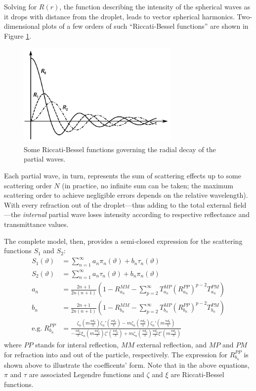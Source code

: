 \documentclass[11.5pt,oneside]{book}
\begin{document}
Solving for $R(r)$, the function describing the intensity of the spherical waves
as it drops with distance from the droplet, leads to vector spherical harmonics.
Two-dimensional plots of a few orders of such ``Riccati-Bessel functions'' are
shown in Figure \ref{fig:besselfuncs}.

\begin{figure}
    \centering
    \includegraphics[width=0.7\textwidth]{img/scattering/bessel.pdf}
    \caption{Some Riccati-Bessel functions governing the radial decay of the partial
    waves.}
    \label{fig:besselfuncs}
\end{figure}

Each partial wave, in turn, represents the sum of scattering effects up to some
scattering order $N$ (in practice, no infinite sum can be taken; the maximum
scattering order to achieve negligible errors depends on the relative
wavelength). With every refraction out of the droplet---thus adding to the
total external field---the \emph{internal} partial wave loses intensity
according to respective reflectance and transmittance values.


The complete model, then, provides a semi-closed expression for the scattering
functions $S_1$ and $S_2$:
   \begin{align}
      S_1(\vartheta) &= \sum_{n=1}^{\infty} a_n\pi_n(\vartheta) +
      b_n\tau_n(\vartheta) \\
      S_2(\vartheta) &= \sum_{n=1}^{\infty} a_n\tau_n(\vartheta) +
      b_n\pi_n(\vartheta) \\
      a_n &= \frac{2n+1}{2n(n+1)} (1-R^{MM}_{a_n} - \sum_{p=2}^{\infty}
      T_{a_n}^{MP} (R_{a_n}^{PP})^{p-2} T_{a_n}^{PM}) \\
      b_n &= \frac{2n+1}{2n(n+1)} (1-R^{MM}_{b_n} - \sum_{p=2}^{\infty}
      T_{b_n}^{MP} (R_{b_n}^{PP})^{p-2} T_{b_n}^{PM}) \\
      \mathrm{e.g.\;} R_{b_n}^{PP} &= \frac{\zeta_n(m \frac{\pi
      d_p}{\lambda})\zeta_n'(\frac{\pi d_p}{\lambda}) -
      m\zeta_n(\frac{\pi d_p}{\lambda})\zeta_n'(m \frac{\pi
      d_p}{\lambda})}{-\frac{\pi d_p}{\lambda}\xi_n(m \frac{\pi
      d_p}{\lambda})\zeta'(\frac{\pi d_p}{\lambda}) + m\zeta_n(\frac{\pi
      d_p}{\lambda})\frac{\pi d_p}{\lambda}\xi'(m \frac{\pi
      d_p}{\lambda})}
    \end{align}
where $PP$ stands for interal reflection, $MM$ external reflection, and $MP$
and $PM$ for refraction into and out of the particle, respectively. The
expression for $R_{b_n}^{PP}$ is shown above to illustrate the coefficents'
form. Note that in the above equations, $\pi$ and $\tau$ are associated Legendre functions and $\zeta$ and $\xi$ are Riccati-Bessel functions.
\end{document}
